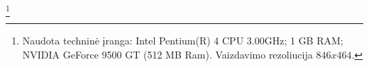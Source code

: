 \footnote[1]{Naudota techninė įranga: Intel Pentium(R) 4 CPU 3.00GHz; 1 GB
RAM; NVIDIA GeForce 9500 GT (512 MB Ram). Vaizdavimo rezoliucija $846x464$.}

